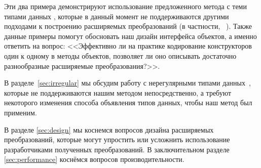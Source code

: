 Эти два примера демонстрируют использование предложенного метода с теми типами данных \OCaml{}, которые в данный момент не поддерживаются другими подходами к построению расширяемых преобразований (в частности, \visitors~\cite{Visitors}). 
Также данные примеры помогут обосновать наш дизайн  интерфейса объектов, а именно ответить на вопрос: <<Эффективно ли  на практике кодирование конструкторов один к одному в методы объектов, позволяет ли оно описывать достаточно разнообразные расширяемые преобразования?>>.


В разделе~\ref{sec:irregular} мы обсудим работу с нерегулярными типами данных~\cite{irregular}, которые не поддерживаются нашим методом непосредственно, а требуют некоторого изменения способа объявления типов данных, чтобы наш метод был применим. %





В разделе \ref{sec:design} мы коснемся вопросов дизайна расширяемых преобразований, которые могут упростить или усложнить использование  разработчиками полученных преобразований. В заключительном разделе \ref{sec:performance} коснёмся вопросов производительности.




